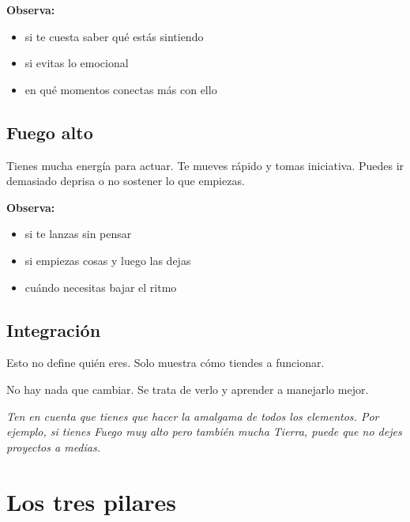 \documentclass[11pt,a4paper]{article}
\begin{document}
\textbf{Observa:}
\begin{itemize}
\item si te cuesta saber qué estás sintiendo
\item si evitas lo emocional
\item en qué momentos conectas más con ello
\end{itemize}

\vspace{0.4cm}

\subsection{Fuego alto}

Tienes mucha energía para actuar. Te mueves rápido y tomas iniciativa. Puedes ir demasiado deprisa o no sostener lo que empiezas.

\textbf{Observa:}
\begin{itemize}
\item si te lanzas sin pensar
\item si empiezas cosas y luego las dejas
\item cuándo necesitas bajar el ritmo
\end{itemize}

\vspace{0.4cm}

\subsection{Integración}

Esto no define quién eres. Solo muestra cómo tiendes a funcionar.

No hay nada que cambiar. Se trata de verlo y aprender a manejarlo mejor.

\vspace{0.4cm}

\begin{center}
{\small\itshape
Ten en cuenta que tienes que hacer la amalgama de todos los elementos. Por ejemplo, si tienes Fuego muy alto pero también mucha Tierra, puede que no dejes proyectos a medias.
}
\end{center}


\vspace{0.8cm}



\section{Los tres pilares}
\end{document}
